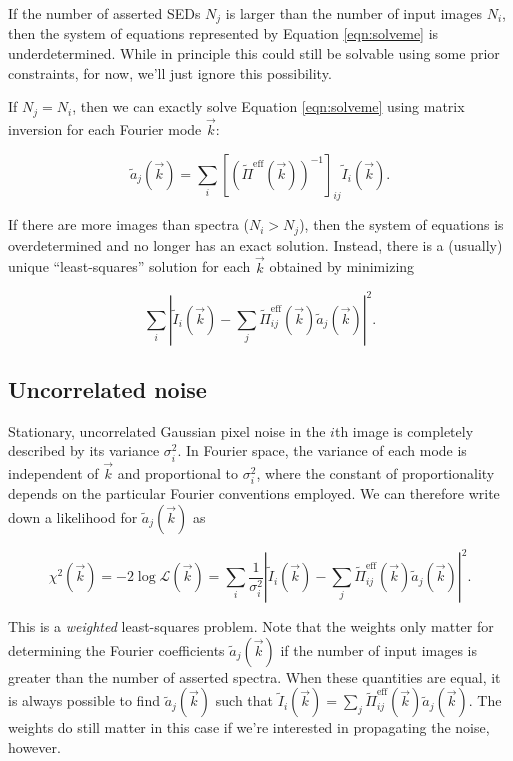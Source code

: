 \documentclass{article}
\begin{document}
If the number of asserted SEDs $N_j$ is larger than the number of input images $N_i$, then the
system of equations represented by Equation \ref{eqn:solveme} is underdetermined.  While in
principle this could still be solvable using some prior constraints, for now, we'll just ignore this
possibility.

If $N_j = N_i$, then we can exactly solve Equation \ref{eqn:solveme} using matrix inversion for each
Fourier mode $\vec{k}$:

\begin{equation}
  \tilde{a}_j(\vec{k}) = \sum_i [(\tilde{\Pi}^\mathrm{eff}(\vec{k}))^{-1}]_{ij} \tilde{I}_i(\vec{k}).
\end{equation}

If there are more images than spectra ($N_i > N_j$), then the system of equations is overdetermined
and no longer has an exact solution.  Instead, there is a (usually) unique ``least-squares''
solution for each $\vec{k}$ obtained by minimizing

\begin{equation}
  \label{eqn:lstsq}
  \sum_i\left|\tilde{I}_i(\vec{k}) - \sum_j \tilde{\Pi}^\mathrm{eff}_{ij}(\vec{k}) \tilde{a}_j(\vec{k})\right|^2.
\end{equation}

\subsection{Uncorrelated noise}

Stationary, uncorrelated Gaussian pixel noise in the $i$th image is completely described by its
variance $\sigma^2_i$.  In Fourier space, the variance of each mode is independent of $\vec{k}$ and
proportional to $\sigma^2_i$, where the constant of proportionality depends on the particular
Fourier conventions employed.  We can therefore write down a likelihood for $\tilde{a}_j(\vec{k})$
as

\begin{equation}
    \label{eqn:like}
    \chi^2(\vec{k}) = -2 \log \mathcal{L}(\vec{k}) = \sum_i\frac{1}{\sigma_i^2}\left|\tilde{I}_i(\vec{k}) - \sum_j \tilde{\Pi}^\mathrm{eff}_{ij}(\vec{k}) \tilde{a}_j(\vec{k})\right|^2.
\end{equation}

This is a \textit{weighted} least-squares problem.  Note that the weights only matter for
determining the Fourier coefficients $\tilde{a}_j(\vec{k})$ if the number of input images is greater
than the number of asserted spectra.  When these quantities are equal, it is always possible to find
$\tilde{a}_j(\vec{k})$ such that $\tilde{I}_i(\vec{k}) = \sum_j
\tilde{\Pi}^\mathrm{eff}_{ij}(\vec{k}) \tilde{a}_j(\vec{k})$.  The weights do still matter in this
case if we're interested in propagating the noise, however.
\end{document}
